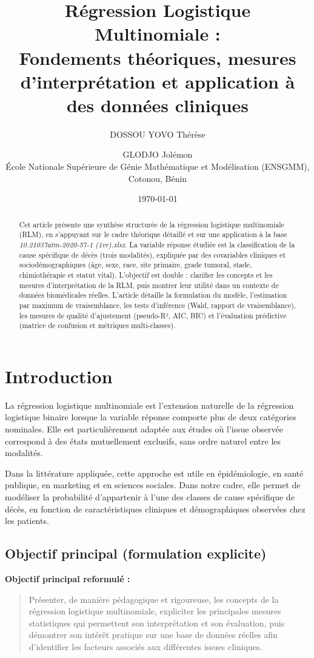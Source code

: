 \documentclass[12pt,a4paper]{article}
\title{\textbf{Régression Logistique Multinomiale :}\\
Fondements théoriques, mesures d'interprétation et application à des données cliniques}
\author{DOSSOU YOVO Thérèse \and GLODJO Jolémon\\
École Nationale Supérieure de Génie Mathématique et Modélisation (ENSGMM), Cotonou, Bénin}
\date{\today}
\begin{document}
\maketitle

\begin{abstract}
Cet article présente une synthèse structurée de la régression logistique multinomiale (RLM), en s'appuyant sur le cadre théorique détaillé et sur une application à la base \textit{10.21037atm-2020-57-1 (1vr).xlsx}. La variable réponse étudiée est la classification de la cause spécifique de décès (trois modalités), expliquée par des covariables cliniques et sociodémographiques (âge, sexe, race, site primaire, grade tumoral, stade, chimiothérapie et statut vital). L'objectif est double : clarifier les concepts et les mesures d'interprétation de la RLM, puis montrer leur utilité dans un contexte de données biomédicales réelles. L'article détaille la formulation du modèle, l'estimation par maximum de vraisemblance, les tests d'inférence (Wald, rapport de vraisemblance), les mesures de qualité d'ajustement (pseudo-R², AIC, BIC) et l'évaluation prédictive (matrice de confusion et métriques multi-classes).
\end{abstract}

\section{Introduction}

La régression logistique multinomiale est l'extension naturelle de la régression logistique binaire lorsque la variable réponse comporte plus de deux catégories nominales. Elle est particulièrement adaptée aux études où l'issue observée correspond à des états mutuellement exclusifs, sans ordre naturel entre les modalités.

Dans la littérature appliquée, cette approche est utile en épidémiologie, en santé publique, en marketing et en sciences sociales. Dans notre cadre, elle permet de modéliser la probabilité d'appartenir à l'une des classes de cause spécifique de décès, en fonction de caractéristiques cliniques et démographiques observées chez les patients.

\subsection{Objectif principal (formulation explicite)}

\textbf{Objectif principal reformulé :}
\begin{quote}
Présenter, de manière pédagogique et rigoureuse, les concepts de la régression logistique multinomiale, expliciter les principales mesures statistiques qui permettent son interprétation et son évaluation, puis démontrer son intérêt pratique sur une base de données réelles afin d'identifier les facteurs associés aux différentes issues cliniques.
\end{quote}
\end{document}
